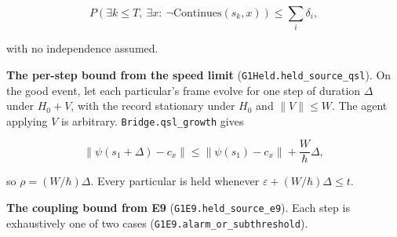 \documentclass[
]{article}
\begin{document}
\[
P(\exists k\le T,\ \exists x:\ \neg\mathrm{Continues}(s_k,x))\le\sum_i\delta_i,
\]

with no independence assumed.

\textbf{The per-step bound from the speed limit}
(\texttt{G\allowbreak{}1\allowbreak{}H\allowbreak{}e\allowbreak{}l\allowbreak{}d\allowbreak{}.\allowbreak{}h\allowbreak{}e\allowbreak{}l\allowbreak{}d\allowbreak{}\_\allowbreak{}s\allowbreak{}o\allowbreak{}u\allowbreak{}r\allowbreak{}c\allowbreak{}e\allowbreak{}\_\allowbreak{}q\allowbreak{}s\allowbreak{}l}).
On the good event, let each particular's frame evolve for one step of
duration \(\Delta\) under \(H_0+V\), with the record stationary under
\(H_0\) and \(\|V\|\le W\). The agent applying \(V\) is arbitrary.
\texttt{B\allowbreak{}r\allowbreak{}i\allowbreak{}d\allowbreak{}g\allowbreak{}e\allowbreak{}.\allowbreak{}q\allowbreak{}s\allowbreak{}l\allowbreak{}\_\allowbreak{}g\allowbreak{}r\allowbreak{}o\allowbreak{}w\allowbreak{}t\allowbreak{}h}
gives

\[
\|\psi(s_1+\Delta)-c_x\|\le\|\psi(s_1)-c_x\|+\frac W\hbar\Delta,
\]

so \(\rho=(W/\hbar)\Delta\). Every particular is held whenever
\(\varepsilon+(W/\hbar)\Delta\le t\).

\textbf{The coupling bound from E9}
(\texttt{G\allowbreak{}1\allowbreak{}E\allowbreak{}9\allowbreak{}.\allowbreak{}h\allowbreak{}e\allowbreak{}l\allowbreak{}d\allowbreak{}\_\allowbreak{}s\allowbreak{}o\allowbreak{}u\allowbreak{}r\allowbreak{}c\allowbreak{}e\allowbreak{}\_\allowbreak{}e\allowbreak{}9}).
Each step is exhaustively one of two cases
(\texttt{G\allowbreak{}1\allowbreak{}E\allowbreak{}9\allowbreak{}.\allowbreak{}a\allowbreak{}l\allowbreak{}a\allowbreak{}r\allowbreak{}m\allowbreak{}\_\allowbreak{}o\allowbreak{}r\allowbreak{}\_\allowbreak{}s\allowbreak{}u\allowbreak{}b\allowbreak{}t\allowbreak{}h\allowbreak{}r\allowbreak{}e\allowbreak{}s\allowbreak{}h\allowbreak{}o\allowbreak{}l\allowbreak{}d}).
\end{document}
